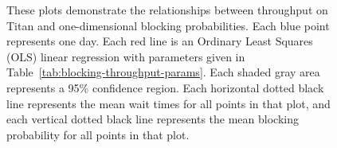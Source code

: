 \begin{figure}
  \vspace{1em}
  \caption{These plots demonstrate the relationships between throughput on
Titan and one-dimensional blocking probabilities. Each blue point represents
one day. Each red line is an Ordinary Least Squares (OLS) linear regression
with parameters given in Table~\ref{tab:blocking-throughput-params}. Each
shaded gray area represents a 95\% confidence region. Each horizontal dotted
black line represents the mean wait times for all points in that plot, and each
vertical dotted black line represents the mean blocking probability for all
points in that plot.}
\end{figure}

